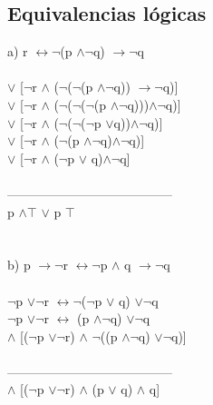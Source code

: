 \documentclass[11pt,letterpaper]{article}
\begin{document}
    \subsection{Equivalencias lógicas}
        a) r $\leftrightarrow \neg$(p $\wedge \neg$q) $\rightarrow \neg$q \\ \\
         $\vee$ [$\neg$r $\wedge$ ($\neg$($\neg$(p $\wedge \neg$q)) $\rightarrow \neg$q)] \\
         $\vee$ [$\neg$r $\wedge$ ($\neg$($\neg$($\neg$(p $\wedge \neg$q)))$\wedge \neg$q)]\\
         $\vee$ [$\neg$r $\wedge$ ($\neg$($\neg$($\neg$p $\vee $q))$\wedge \neg$q)]\\
         $\vee$ [$\neg$r $\wedge$ ($\neg$(p $\wedge \neg$q)$\wedge \neg$q)]\\
         $\vee$ [$\neg$r $\wedge$ ($\neg$p $\vee$ q)$\wedge \neg$q]\\ \\
        --------------------------------------- \\
        \qquad \qquad p $\wedge \top$ $\vee$ p $\top$  \\ \\ \\
        \qquad b) p $\rightarrow \neg$r $\leftrightarrow \neg$p $\wedge$ q $\rightarrow \neg$q \\ \\
        \qquad $\neg$p $\vee \neg$r $\leftrightarrow \neg$($\neg$p $\vee$ q) $\vee \neg$q \\
        \qquad $\neg$p $\vee \neg$r $\leftrightarrow$ (p $\wedge \neg$q) $\vee \neg$q \\
         $\wedge$ [($\neg$p $\vee \neg$r) $\wedge$ $\neg$((p $\wedge \neg$q) $\vee \neg$q)] \\ \\
        --------------------------------------- \\
         $\wedge$ [($\neg$p $\vee \neg$r) $\wedge$ (p $\vee$ q) $\wedge$ q] \\ \\ \\ \\ \\
\end{document}
